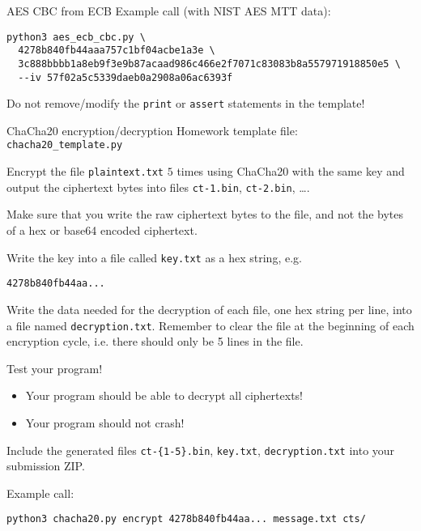 \documentclass{homework}
\begin{document}
\begin{task}{AES CBC from ECB}
  Example call (with NIST AES MTT data):%
  \begin{Verbatim}
python3 aes_ecb_cbc.py \ 
  4278b840fb44aaa757c1bf04acbe1a3e \
  3c888bbbb1a8eb9f3e9b87acaad986c466e2f7071c83083b8a557971918850e5 \
  --iv 57f02a5c5339daeb0a2908a06ac6393f
  \end{Verbatim}

  Do not remove/modify the \texttt{print} or \texttt{assert} statements in the template!
\end{task}




\begin{task}{ChaCha20 encryption/decryption}
  Homework template file: \texttt{chacha20\_template.py}

  Encrypt the file \texttt{plaintext.txt} $5$ times using ChaCha20 with the same key and output the ciphertext bytes into files \texttt{ct-1.bin}, \texttt{ct-2.bin}, \dots.

  \begin{tcolorbox}[title=Note]
    Make sure that you write the raw ciphertext bytes to the file, and not the bytes of a hex or base64 encoded ciphertext.
  \end{tcolorbox}

  Write the key into a file called \texttt{key.txt} as a hex string, e.g.
  \begin{tcolorbox}[title={\texttt{key.txt}}]
    \texttt{4278b840fb44aa...}
  \end{tcolorbox}

  Write the data needed for the decryption of each file, one hex string per line, into a file named \texttt{decryption.txt}.
  Remember to clear the file at the beginning of each encryption cycle, i.e. there should only be 5 lines in the file.

  Test your program!
  \begin{itemize}
    \item Your program should be able to decrypt all ciphertexts!
    \item Your program should not crash!
  \end{itemize}

  Include the generated files \texttt{ct-\{1-5\}.bin}, \texttt{key.txt}, \texttt{decryption.txt} into your submission ZIP.

  Example call:%
  \begin{Verbatim}
python3 chacha20.py encrypt 4278b840fb44aa... message.txt cts/
  \end{Verbatim}
\end{task}
\end{document}
